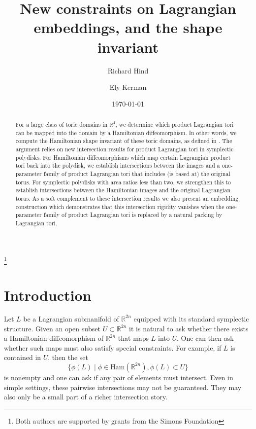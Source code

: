 \documentclass[12pt]{amsart}
\theoremstyle{definition}
\newcommand{\RR}{{\mathbb R}}
\begin{document}
\title[Constraints on Lagrangians, and the shape invariant]{New constraints on Lagrangian embeddings, and the shape invariant}
\date{\today}
\author{Richard Hind}
\address{RH: Department of Mathematics\\
University of Notre Dame\\
255 Hurley\\
Notre Dame, IN 46556, USA.}
\author{Ely Kerman}
\address{EK: Department of Mathematics\\
University of Illinois at Urbana-Champaign\\
1409 West Green Street\\
Urbana, IL 61801, USA.}
\thanks{Both authors are supported by grants from the Simons Foundation}


\begin{abstract}
For a large class of toric domains in $\RR^4$,  we determine which product Lagrangian tori can be mapped into the domain by a Hamiltonian diffeomorphism. In other words, we compute the Hamiltonian shape invariant of these toric domains, as defined in \cite{hizh}. The argument relies on new intersection results for product Lagrangian tori in symplectic polydisks. For Hamiltonian diffeomorphisms which map certain Lagrangian product tori back into the polydisk, we establish intersections between the images and a one-parameter family of product Lagrangian tori that includes (is based at) the original torus. For symplectic polydisks with area ratios less than two, we strengthen this to establish intersections between the Hamiltonian images and the original Lagrangian torus. As a soft complement to these intersection results we also present an embedding construction which demonstrates that this intersection rigidity vanishes when the one-parameter family of product Lagrangian tori is replaced by a natural packing by Lagrangian tori.

\end{abstract}

\maketitle

\section{Introduction}

Let $L$ be a Lagrangian submanifold of $\RR^{2n}$ equipped with its standard symplectic structure. Given an open subset $U \subset \RR^{2n}$ it is natural to ask whether there exists a Hamiltonian diffeomorphism of $\RR^{2n}$ that maps $L$ into $U$. One can then ask whether such maps must also satisfy special constraints. For example, if $L$ is contained in $U$, then  the 
set  $$\{ \phi(L) \mid \phi \in \mathrm{Ham}(\RR^{2n}), \phi(L) \subset U\}$$ is nonempty and one can ask if any pair of elements must intersect. Even in simple settings, these pairwise intersections may not be guaranteed. They may also only be a small part of a richer intersection story.
\end{document}
